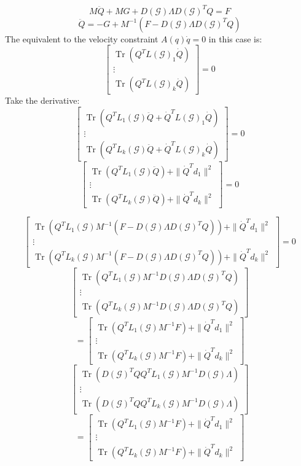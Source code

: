 \documentclass[conference]{IEEEtran}
\DeclareMathOperator{\Tr}{Tr}
\begin{document}
$$M\ddot{Q}+MG+D(\mathcal{G})\Lambda D(\mathcal{G})^TQ=F$$
$$\ddot{Q}=-G+M^{-1}(F-D(\mathcal{G})\Lambda D(\mathcal{G})^TQ)$$
The equivalent to the velocity constraint $A(q)\dot{q}=0$ in this case is:
$$\begin{bmatrix}
    \Tr(Q^TL(\mathcal{G})_1\dot{Q})\\
    \vdots\\
    \Tr(Q^TL(\mathcal{G})_k\dot{Q})
\end{bmatrix}=0$$
Take the derivative:
$$\begin{bmatrix}
    \Tr(Q^TL_1(\mathcal{G})\ddot{Q}+\dot{Q}^TL(\mathcal{G})_1\dot{Q})\\
    \vdots\\
    \Tr(Q^TL_k(\mathcal{G})\ddot{Q}+\dot{Q}^TL(\mathcal{G})_k\dot{Q})
\end{bmatrix}=0$$
$$\begin{bmatrix}
    \Tr(Q^TL_1(\mathcal{G})\ddot{Q})+\|\dot{Q}^Td_1\|^2\\
    \vdots\\
    \Tr(Q^TL_k(\mathcal{G})\ddot{Q})+\|\dot{Q}^Td_k\|^2
\end{bmatrix}=0$$

$$\begin{bmatrix}
    \Tr(Q^TL_1(\mathcal{G})M^{-1}(F-D(\mathcal{G})\Lambda D(\mathcal{G})^TQ))+\|\dot{Q}^Td_1\|^2\\
    \vdots\\
    \Tr(Q^TL_k(\mathcal{G})M^{-1}(F-D(\mathcal{G})\Lambda D(\mathcal{G})^TQ))+\|\dot{Q}^Td_k\|^2
\end{bmatrix}=0$$
$$\begin{bmatrix}
    \Tr(Q^TL_1(\mathcal{G})M^{-1}D(\mathcal{G})\Lambda D(\mathcal{G})^TQ)\\
    \vdots\\
    \Tr(Q^TL_k(\mathcal{G})M^{-1}D(\mathcal{G})\Lambda D(\mathcal{G})^TQ)
\end{bmatrix}$$
$$=\begin{bmatrix}
    \Tr(Q^TL_1(\mathcal{G})M^{-1}F)+\|\dot{Q}^Td_1\|^2\\
    \vdots\\
    \Tr(Q^TL_k(\mathcal{G})M^{-1}F)+\|\dot{Q}^Td_k\|^2
\end{bmatrix}$$
$$\begin{bmatrix}
    \Tr(D(\mathcal{G})^TQQ^TL_1(\mathcal{G})M^{-1}D(\mathcal{G})\Lambda)\\
    \vdots\\
    \Tr(D(\mathcal{G})^TQQ^TL_k(\mathcal{G})M^{-1}D(\mathcal{G})\Lambda)
\end{bmatrix}$$
$$=\begin{bmatrix}
    \Tr(Q^TL_1(\mathcal{G})M^{-1}F)+\|\dot{Q}^Td_1\|^2\\
    \vdots\\
    \Tr(Q^TL_k(\mathcal{G})M^{-1}F)+\|\dot{Q}^Td_k\|^2
\end{bmatrix}$$
\end{document}
